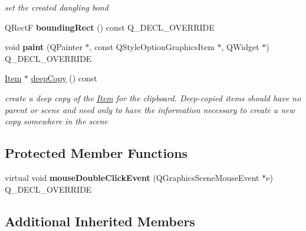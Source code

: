 \begin{DoxyCompactItemize}
\begin{DoxyCompactList}\small\item\em set the created dangling bond \end{DoxyCompactList}\item 
Q\+RectF {\bfseries bounding\+Rect} () const Q\+\_\+\+D\+E\+C\+L\+\_\+\+O\+V\+E\+R\+R\+I\+DE\hypertarget{classprim_1_1LatticeDot_a0ffa32428b40778903c3ec86ee9a0df1}{}\label{classprim_1_1LatticeDot_a0ffa32428b40778903c3ec86ee9a0df1}

\item 
void {\bfseries paint} (Q\+Painter $\ast$, const Q\+Style\+Option\+Graphics\+Item $\ast$, Q\+Widget $\ast$) Q\+\_\+\+D\+E\+C\+L\+\_\+\+O\+V\+E\+R\+R\+I\+DE\hypertarget{classprim_1_1LatticeDot_a91aaa7de48bcf0be8bbf598fc23b74f8}{}\label{classprim_1_1LatticeDot_a91aaa7de48bcf0be8bbf598fc23b74f8}

\item 
\hyperlink{classprim_1_1Item}{Item} $\ast$ \hyperlink{classprim_1_1LatticeDot_af47222050d9b850de87a4d9921bc9db7}{deep\+Copy} () const \hypertarget{classprim_1_1LatticeDot_af47222050d9b850de87a4d9921bc9db7}{}\label{classprim_1_1LatticeDot_af47222050d9b850de87a4d9921bc9db7}

\begin{DoxyCompactList}\small\item\em create a deep copy of the \hyperlink{classprim_1_1Item}{Item} for the clipboard. Deep-\/copied items should have no parent or scene and need only to have the information necessary to create a new copy somewhere in the scene \end{DoxyCompactList}\end{DoxyCompactItemize}
\subsection*{Protected Member Functions}
\begin{DoxyCompactItemize}
\item 
virtual void {\bfseries mouse\+Double\+Click\+Event} (Q\+Graphics\+Scene\+Mouse\+Event $\ast$e) Q\+\_\+\+D\+E\+C\+L\+\_\+\+O\+V\+E\+R\+R\+I\+DE\hypertarget{classprim_1_1LatticeDot_a09eb56de975cdd92bb80cf7d661b4e57}{}\label{classprim_1_1LatticeDot_a09eb56de975cdd92bb80cf7d661b4e57}

\end{DoxyCompactItemize}
\subsection*{Additional Inherited Members}


